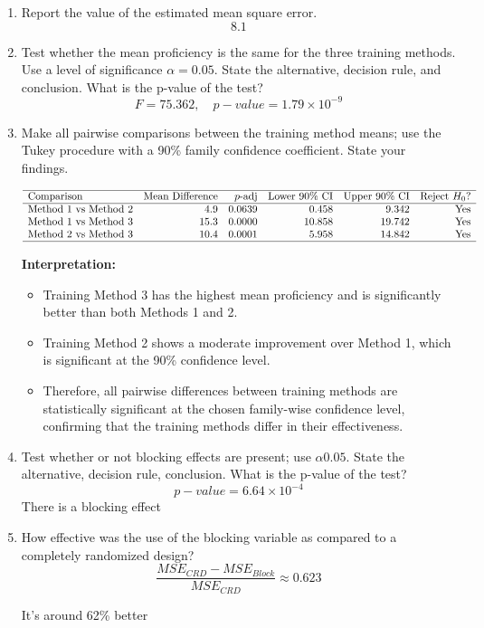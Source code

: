 \documentclass{article}
\begin{document}
\begin{enumerate}
	\item Report the value of the estimated mean square error.
	      $$
		      8.1
	      $$
	\item Test whether the mean proficiency is the same for the three training methods. Use a level of significance
	      $\alpha = 0.05$. State the alternative, decision rule, and conclusion. What is the p-value of the test?
	      $$
		      F= 75.362, \quad p-value = 1.79 \times 10^{-9}
	      $$
	\item Make all pairwise comparisons between the training method means; use the Tukey procedure with a 90\% family
	      confidence coefficient. State your findings.

	      \[
		      \begin{array}{lrrrrrr}
			      \hline
			      \text{Comparison}           & \text{Mean Difference} & p\text{-adj} & \text{Lower 90\% CI} & \text{Upper 90\% CI} & \text{Reject } H_0? \\
			      \hline
			      \text{Method 1 vs Method 2} & 4.9                    & 0.0639       & 0.458                & 9.342                & \text{Yes}          \\
			      \text{Method 1 vs Method 3} & 15.3                   & 0.0000       & 10.858               & 19.742               & \text{Yes}          \\
			      \text{Method 2 vs Method 3} & 10.4                   & 0.0001       & 5.958                & 14.842               & \text{Yes}          \\
			      \hline
		      \end{array}
	      \]

	      \textbf{Interpretation:}

	      \begin{itemize}
		      \item Training Method 3 has the highest mean proficiency and is significantly better than both Methods 1 and 2.
		      \item Training Method 2 shows a moderate improvement over Method 1, which is significant at the 90\% confidence level.
		      \item Therefore, all pairwise differences between training methods are statistically significant at the chosen family-wise confidence level, confirming that the training methods differ in their effectiveness.
	      \end{itemize}

	\item Test whether or not blocking effects are present; use $\alpha 0.05$. State the alternative, decision rule,
	      conclusion. What is the p-value of the test?
	      $$
		      p-value = 6.64 \times 10^{-4}
	      $$
	      There is a blocking effect
	\item How effective was the use of the blocking variable as compared to a completely randomized design?
	      $$
		      \frac{MSE_{CRD}-MSE_{Block}}{MSE_{CRD}}\approx 0.623
	      $$

	      It's around 62\% better
\end{enumerate}
\end{document}
